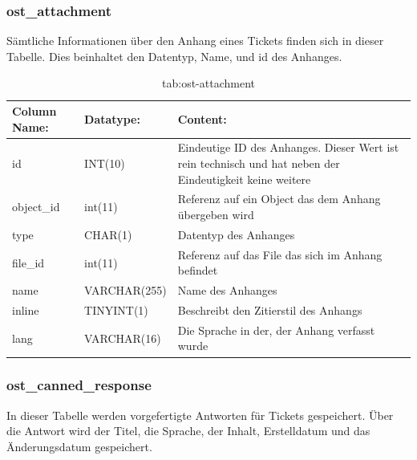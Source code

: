 \subsubsection{ost\_attachment}

Sämtliche Informationen über den Anhang eines Tickets finden sich in dieser Tabelle. Dies beinhaltet den Datentyp, Name, und id des Anhanges. 

\begin{table}[h]
	\begin{tabular}{|p{3.5cm}|p{4cm}|p{6.2cm}|}
		\hline
		\textbf{Column Name:} & \textbf{Datatype:} & \textbf{Content:} \\
		\hline
		id & INT(10) & Eindeutige ID des Anhanges. Dieser Wert ist rein technisch und hat  neben der Eindeutigkeit keine weitere  \\
		\hline
		object\_id & int(11) & Referenz auf ein Object das dem Anhang übergeben wird \\
		\hline
		type & CHAR(1) & Datentyp des Anhanges \\
		\hline
		file\_id & int(11) & Referenz auf das File das sich im Anhang befindet\\
		\hline
		name & VARCHAR(255) & Name des Anhanges \\
		\hline
		inline & TINYINT(1) & Beschreibt den Zitierstil des Anhangs \\
		\hline
		lang & VARCHAR(16) & Die Sprache in der, der Anhang verfasst wurde \\
		\hline
	\end{tabular}
	\caption{tab:ost-attachment}
\end{table}
\label{tab:ost_attachment}

\newpage

\subsubsection{ost\_canned\_response}

In dieser Tabelle werden vorgefertigte Antworten für Tickets gespeichert. Über die Antwort wird der Titel, die Sprache, der Inhalt, Erstelldatum und das Änderungsdatum gespeichert.

